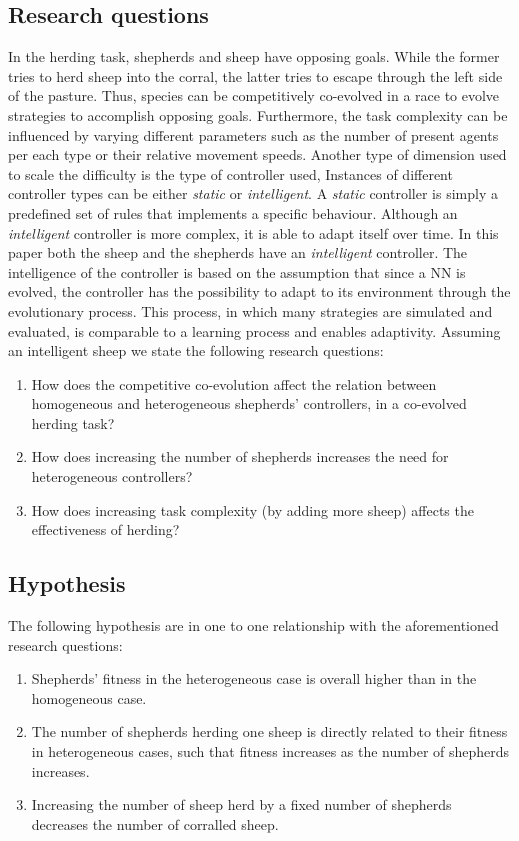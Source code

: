 \documentclass[conference]{IEEEtran}
\begin{document}
\subsection{Research questions}
In the herding task, shepherds and sheep have opposing goals.
While the former tries to herd sheep into the corral, the latter tries to escape through the left side of the pasture. 
Thus, species can be competitively co-evolved in a race to evolve strategies to accomplish opposing goals. 
Furthermore, the task complexity can be influenced by varying different parameters such as the number of present agents per each type or their relative movement speeds. 
Another type of dimension used to scale the difficulty is the type of controller used,
Instances of different controller types can be either \textit{static} or \textit{intelligent}.
A \textit{static} controller is simply a predefined set of rules that implements a specific behaviour.
Although an \textit{intelligent} controller is more complex, it is able to  adapt itself over time.
In this paper both the sheep and the shepherds have an \textit{intelligent} controller.
The intelligence of the controller is based on the assumption that since a NN is evolved, the controller has the possibility to adapt to its environment through the evolutionary process. 
This process, in which many strategies are simulated and evaluated, is comparable to a learning process and enables adaptivity. 
Assuming an intelligent sheep we state the following research questions:
 
\begin{enumerate}
	\item How does the competitive co-evolution affect the relation between homogeneous and heterogeneous shepherds' controllers, in a co-evolved herding task?
	\item How does increasing the number of shepherds increases the need for heterogeneous controllers?
	\item How does increasing task complexity (by adding more sheep) affects the effectiveness of herding?
\end{enumerate}

\subsection{Hypothesis}
\label{sec:hypothesis}
The following hypothesis are in one to one relationship with the aforementioned research questions:

\begin{enumerate}
	\item Shepherds' fitness in the heterogeneous case is overall higher than in the homogeneous case.
	\item The number of shepherds herding one sheep is directly related to their fitness in heterogeneous cases, such that fitness increases as the number of shepherds increases.	
	\item Increasing the number of sheep herd by a fixed number of shepherds decreases the number of corralled sheep.
\end{enumerate}
\end{document}
